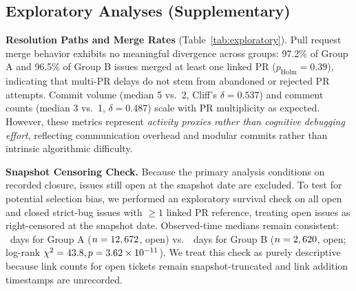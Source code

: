 \subsection{Exploratory Analyses (Supplementary)}\label{sec:exploratory}

\textbf{Resolution Paths and Merge Rates} (Table~\ref{tab:exploratory}). Pull request merge behavior exhibits no meaningful divergence across groups: 97.2\% of Group A and 96.5\% of Group B issues merged at least one linked PR ($p_{\mathrm{Holm}}=0.39$), indicating that multi-PR delays do not stem from abandoned or rejected PR attempts. Commit volume (median 5 vs.\ 2, Cliff's $\delta = 0.537$) and comment counts (median 3 vs.\ 1, $\delta = 0.487$) scale with PR multiplicity as expected. However, these metrics represent \emph{activity proxies rather than cognitive debugging effort}, reflecting communication overhead and modular commits rather than intrinsic algorithmic difficulty.



\textbf{Snapshot Censoring Check.} Because the primary analysis conditions on recorded closure, issues still open at the snapshot date are excluded. To test for potential selection bias, we performed an exploratory survival check on all open and closed strict-bug issues with $\ge 1$ linked PR reference, treating open issues as right-censored at the snapshot date. Observed-time medians remain consistent: \valkmAmed{}~days for Group A ($n=12,672$, \valkmAopen{} open) vs.\ \valkmBmed{}~days for Group B ($n=2,620$, \valkmBopen{} open; log-rank $\chi^2=43.8, p=3.62\times 10^{-11}$). We treat this check as purely descriptive because link counts for open tickets remain snapshot-truncated and link addition timestamps are unrecorded.
